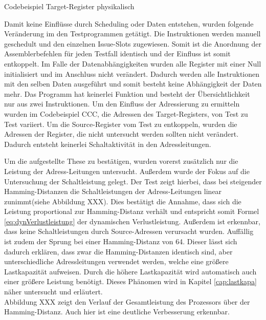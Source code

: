 Codebeispiel Target-Register physikalisch

Damit keine Einflüsse durch Scheduling oder Daten entstehen, wurden folgende Veränderung im den Testprogrammen getätigt. Die Instruktionen werden manuell geschedult und den einzelnen Issue-Slots zugewiesen. Somit ist die Anordnung der Assemblerbefehlen für jeden Testfall identisch und der Einfluss ist somit entkoppelt. Im Falle der Datenabhängigkeiten wurden alle Register mit einer Null initialisiert und im Anschluss nicht verändert. Dadurch werden alle Instruktionen mit den selben Daten ausgeführt und somit besteht keine Abhängigkeit der Daten mehr.
Das Programm hat keinerlei Funktion und besteht der Übersichtlichkeit nur aus zwei Instruktionen.
Um den Einfluss der Adressierung zu ermitteln wurden im Codebeispiel CCC, die Adressen des Target-Registers, von Test zu Test variiert. Um die Source-Register vom Test zu entkoppeln, wurden die Adressen der Register, die nicht untersucht werden sollten nicht verändert. Dadurch entsteht keinerlei Schaltaktivität in den Adressleitungen.

%	

Um die aufgestellte These zu bestätigen, wurden vorerst zusätzlich nur die Leistung der Adress-Leitungen untersucht. Außerdem wurde der Fokus auf die Untersuchung der Schaltleistung gelegt. Der Test zeigt hierbei, dass bei steigender Hamming-Distanzen die Schaltleistungen der Adress-Leitungen linear zunimmt(siehe Abbildung XXX). Dies bestätigt die Annahme, dass sich die Leistung proportional zur Hamming-Distanz verhält und entspricht somit Formel \ref{eq:dynVerlustleistung} der dynamischen Verlustleistung. Außerdem ist erkennbar, dass keine Schaltleistungen durch Source-Adressen verursacht wurden.
Auffällig ist zudem der Sprung bei einer Hamming-Distanz von 64. Dieser lässt sich dadurch erklären, dass zwar die Hamming-Distanzen identisch sind, aber unterschiedliche Adressleitungen verwendet werden, welche eine größere Lastkapazität aufweisen. Durch die höhere Lastkapazität wird automatisch auch einer größere Leistung benötigt. Dieses Phänomen wird in Kapitel \ref{cap:lastkapa} näher untersucht und erläutert.\\
Abbildung XXX zeigt den Verlauf der Gesamtleistung des Prozessors über der Hamming-Distanz. Auch hier ist eine deutliche Verbesserung erkennbar.

